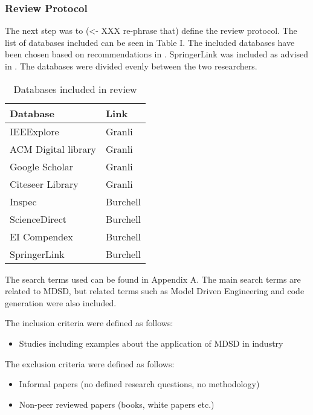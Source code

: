\documentclass[10pt,twocolumn]{article}
\begin{document}
\subsubsection{Review Protocol}
The next step was to (<- XXX re-phrase that) define the review protocol. The list of databases included can be seen in Table I. The included databases have been chosen based on recommendations in \cite{brereton2007lessons}. SpringerLink was included as advised in \cite{keele2007guidelines}. The databases were divided evenly between the two researchers. 

\begin{table}[ht]
	\centering
	\begin{tabular}{|l|l|} 
		\hline
		\textbf{Database} & \textbf{Link}  \\
		\hline
		IEEExplore &  Granli \\
		\hline
		ACM Digital library &  Granli \\
		\hline
		Google Scholar &  Granli \\
		\hline
		Citeseer Library & Granli \\
		\hline
		Inspec &  Burchell \\
		\hline
		ScienceDirect & Burchell \\
		\hline
		EI Compendex &  Burchell \\
		\hline
		SpringerLink & Burchell \\
		\hline
	\end{tabular}
	\caption{Databases included in review}
\end{table}

The search terms used can be found in Appendix A. The main search terms are related to MDSD, but related terms such as Model Driven Engineering and code generation were also included. 

The inclusion criteria were defined as follows: \newline
\begin{itemize} 
\item Studies including examples about the application of MDSD in industry
\end{itemize}

The exclusion criteria were defined as follows: \newline
\begin{itemize}
\item Informal papers (no defined research questions, no methodology)
\item Non-peer reviewed papers (books, white papers etc.)
\end{itemize}
\end{document}
